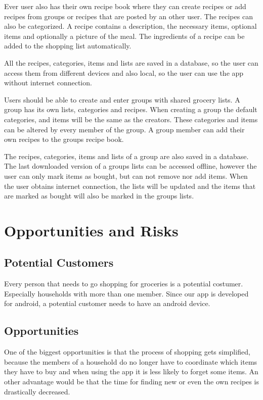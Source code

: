 \documentclass[12pt]{article}
\theoremstyle{definition}
\begin{document}
Ever user also has their own recipe book where they can create recipes or add recipes from groups or recipes that are posted by an other user. The recipes can also be categorized. A recipe contains a description, the necessary items, optional items and optionally a picture of the meal. The ingredients of a recipe can be added to the shopping list automatically.

All the recipes, categories, items and lists are saved in a database, so the user can access them from different devices and also local, so the user can use the app without internet connection.

Users should be able to create and enter groups with shared grocery lists. A group has its own lists, categories and recipes. When creating a group the default categories, and items will be the same as the creators. These categories and items can be altered by every member of the group. A group member can add their own recipes to the groups recipe book.

The recipes, categories, items and lists of a group are also saved in a database. The last downloaded version of a groups lists can be accessed offline, however the user can only mark items as bought, but can not remove nor add items. When the user obtains internet connection, the lists will be updated and the items that are marked as bought will also be marked in the groups lists.

\pagebreak

\section{Opportunities and Risks}
\subsection{Potential Customers}
Every person that needs to go shopping for groceries is a potential costumer. Especially households with more than one member. Since our app is developed for android, a potential customer needs to have an android device.

\subsection{Opportunities}
One of the biggest opportunities is that the process of shopping gets simplified, because the members of a household do no longer have to coordinate which items they have to buy and when using the app it is less likely to forget some items. An other advantage would be that the time for finding new or even the own recipes is drastically decreased.
\end{document}
